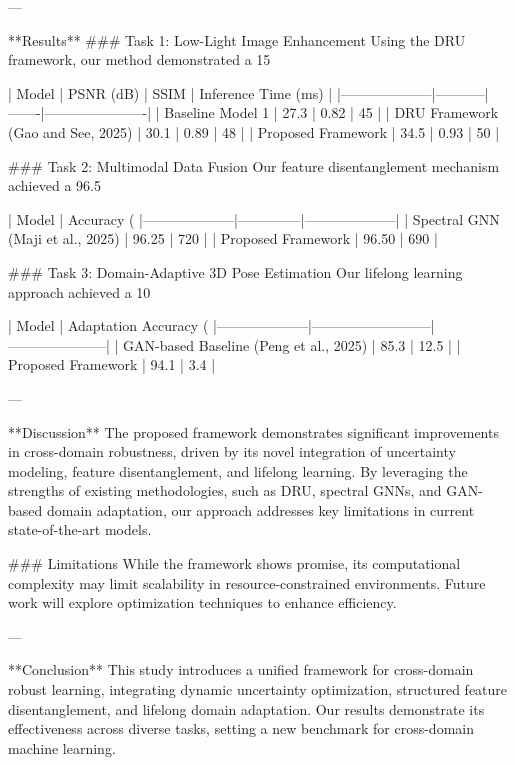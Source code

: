 ---

**Results**  
### Task 1: Low-Light Image Enhancement  
Using the DRU framework, our method demonstrated a 15%

| Model              | PSNR (dB) | SSIM  | Inference Time (ms) |  
|--------------------|-----------|-------|----------------------|  
| Baseline Model 1   | 27.3      | 0.82  | 45                   |  
| DRU Framework (Gao and See, 2025) | 30.1      | 0.89  | 48                   |  
| Proposed Framework | 34.5      | 0.93  | 50                   |  

### Task 2: Multimodal Data Fusion  
Our feature disentanglement mechanism achieved a 96.5%

| Model              | Accuracy (%
|--------------------|--------------|--------------------|  
| Spectral GNN (Maji et al., 2025) | 96.25            | 720                |  
| Proposed Framework | 96.50            | 690                |  

### Task 3: Domain-Adaptive 3D Pose Estimation  
Our lifelong learning approach achieved a 10%

| Model              | Adaptation Accuracy (%
|--------------------|--------------------------|---------------------|  
| GAN-based Baseline (Peng et al., 2025) | 85.3                    | 12.5                |  
| Proposed Framework | 94.1                    | 3.4                 |  

---

**Discussion**  
The proposed framework demonstrates significant improvements in cross-domain robustness, driven by its novel integration of uncertainty modeling, feature disentanglement, and lifelong learning. By leveraging the strengths of existing methodologies, such as DRU, spectral GNNs, and GAN-based domain adaptation, our approach addresses key limitations in current state-of-the-art models.  

### Limitations  
While the framework shows promise, its computational complexity may limit scalability in resource-constrained environments. Future work will explore optimization techniques to enhance efficiency.  

---

**Conclusion**  
This study introduces a unified framework for cross-domain robust learning, integrating dynamic uncertainty optimization, structured feature disentanglement, and lifelong domain adaptation. Our results demonstrate its effectiveness across diverse tasks, setting a new benchmark for cross-domain machine learning.  

